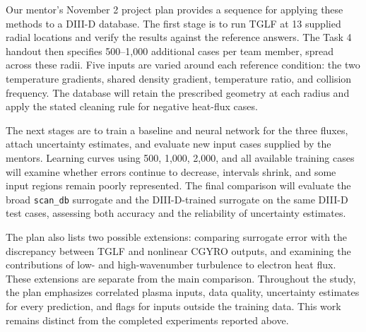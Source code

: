 \documentclass[12pt,letterpaper]{article}
\begin{document}
Our mentor's November 2 project plan provides a sequence for applying these
methods to a DIII-D database. The first stage is to run TGLF at 13 supplied
radial locations and verify the results against the reference answers. The
Task 4 handout then specifies 500--1,000 additional cases per team member,
spread across these radii. Five inputs are varied around each reference
condition: the two temperature gradients, shared density gradient,
temperature ratio, and collision frequency. The database will retain the
prescribed geometry at each radius and apply the stated cleaning rule for
negative heat-flux cases.

The next stages are to train a baseline and neural network for the three
fluxes, attach uncertainty estimates, and evaluate new input cases supplied
by the mentors. Learning curves using 500, 1,000, 2,000, and all available
training cases will examine whether errors continue to decrease, intervals
shrink, and some input regions remain poorly represented. The final comparison
will evaluate the broad \texttt{scan\_db} surrogate and the DIII-D-trained
surrogate on the same DIII-D test cases, assessing both accuracy and the
reliability of uncertainty estimates.

The plan also lists two possible extensions: comparing surrogate error with
the discrepancy between TGLF and nonlinear CGYRO outputs, and examining the
contributions of low- and high-wavenumber turbulence to electron heat flux.
These extensions are separate from the main comparison. Throughout the
study, the plan emphasizes correlated plasma inputs, data quality, uncertainty
estimates for every prediction, and flags for inputs outside the training
data. This work remains distinct from the completed experiments reported above.

\clearpage
\makereference


\end{document}
